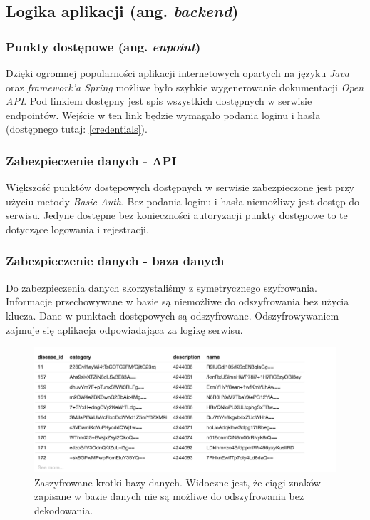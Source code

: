 \subsection{Logika aplikacji (ang. \textit{backend})}

\subsubsection{Punkty dostępowe (ang. \textit{enpoint})}
Dzięki ogromnej popularności aplikacji internetowych opartych na języku \textit{Java} oraz \textit{framework'a Spring} możliwe było szybkie wygenerowanie dokumentacji \textit{Open API}. Pod \href{https://trunk-kartapacjentaservice.herokuapp.com/swagger-ui.html} {linkiem} dostępny jest spis wszystkich dostępnych w serwisie endpointów. Wejście w ten link będzie wymagało podania loginu i hasła (dostępnego tutaj: \ref{credentials}).

\clearpage


\subsubsection{Zabezpieczenie danych - API}
Większość punktów dostępowych dostępnych w serwisie zabezpieczone jest przy użyciu metody \textit{Basic Auth}. Bez podania loginu i hasła niemożliwy jest dostęp do serwisu. Jedyne dostępne bez konieczności autoryzacji punkty dostępowe to te dotyczące logowania i rejestracji.

\subsubsection{Zabezpieczenie danych - baza danych}
Do zabezpieczenia danych skorzystaliśmy z symetrycznego szyfrowania. Informacje przechowywane w bazie są niemożliwe do odszyfrowania bez użycia klucza. Dane w punktach dostępowych są odszyfrowane. Odszyfrowywaniem zajmuje się aplikacja odpowiadająca za logikę serwisu.

\begin{figure}[H]
\centering
\includegraphics[width=15cm]{pictures/bd-encr}
\caption{Zaszyfrowane krotki bazy danych. Widoczne jest, że ciągi znaków zapisane w bazie danych nie są możliwe do odszyfrowania bez dekodowania.}
\end{figure}


